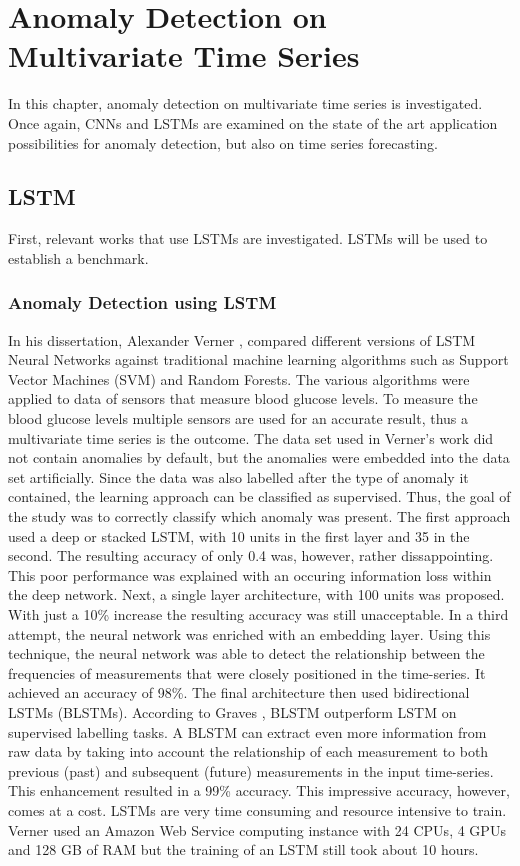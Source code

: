 \section{Anomaly Detection on Multivariate Time Series}
In this chapter, anomaly detection on multivariate time series is investigated. Once again, CNNs and LSTMs are examined on the state of the art application possibilities for anomaly detection, but also on time series forecasting.

\subsection{LSTM}
First, relevant works that use LSTMs are investigated. LSTMs will be used to establish a benchmark.

\subsubsection{Anomaly Detection using LSTM} \label{Anomaly Detection using LSTM}
In his dissertation, Alexander Verner \parencite*{Verner2019}, compared different versions of LSTM Neural Networks against traditional machine learning algorithms such as Support Vector Machines (SVM) and Random Forests. The various algorithms were applied to data of sensors that measure blood glucose levels. To measure the blood glucose levels multiple sensors are used for an accurate result, thus a multivariate time series is the outcome. The data set used in Verner's work did not contain anomalies by default, but the anomalies were embedded into the data set artificially. Since the data was also labelled after the type of anomaly it contained, the learning approach can be classified as supervised. Thus, the goal of the study was to correctly classify which anomaly was present. The first approach used a deep or stacked LSTM, with 10 units in the first layer and 35 in the second. The resulting accuracy of only 0.4 was, however, rather dissappointing. This poor performance was explained with an occuring information loss within the deep network. Next, a single layer architecture, with 100 units was proposed. With just a 10\% increase the resulting accuracy was still unacceptable. In a third attempt, the neural network was enriched with an embedding layer. Using this technique, the neural network was able to detect the relationship between the frequencies of measurements that were closely positioned in the time-series. It achieved an accuracy of 98\%. The final architecture then used bidirectional LSTMs (BLSTMs). According to Graves \parencite*{Graves2005}, BLSTM outperform LSTM on supervised labelling tasks. A BLSTM can extract even more information from raw data by taking into account the relationship of each measurement to both previous (past) and subsequent (future) measurements in the input time-series. This enhancement resulted in a 99\% accuracy. This impressive accuracy, however, comes at a cost. LSTMs are very time consuming and resource intensive to train. Verner used an Amazon Web Service computing instance with 24 CPUs, 4 GPUs and 128 GB of RAM but the training of an LSTM still took about 10 hours.  

